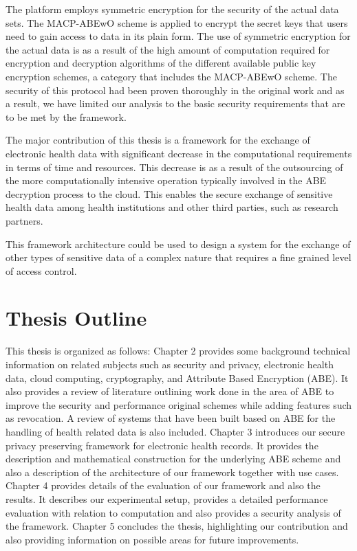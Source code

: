 The platform employs symmetric encryption for the security of the actual data sets. The MACP-ABEwO scheme is applied to encrypt the secret keys that users need to gain access to data in its plain form. The use of symmetric encryption for the actual data is as a result of the high amount of computation required for encryption and decryption algorithms of the different available public key encryption schemes, a category that includes the MACP-ABEwO scheme. The security of this protocol had been proven thoroughly in the original work \cite{Yang2014} and as a result, we have limited our analysis to the basic security requirements that are to be met by the framework.

The major contribution of this thesis is a framework for the exchange of electronic health data with significant decrease in the computational requirements in terms of time and resources. This decrease is as a result of the outsourcing of the more computationally intensive operation typically involved in the ABE decryption process to the cloud. This enables the secure exchange of sensitive health data among health institutions and other third parties, such as research partners.

This framework architecture could be used to design a system for the exchange of other types of sensitive data of a complex nature that requires a fine grained level of access control.


\section{Thesis Outline}

This thesis is organized as follows: Chapter 2 provides some background technical information on related subjects such as security and privacy, electronic health data, cloud computing, cryptography, and Attribute Based Encryption (ABE). It also provides a review of literature outlining work done in the area of ABE to improve the security and performance original schemes while adding features such as revocation. A review of systems that have been built based on ABE for the handling of health related data is also included. Chapter 3 introduces our secure privacy preserving framework for electronic health records. It provides the description and mathematical construction for the underlying ABE scheme and also a description of the architecture of our framework together with use cases. Chapter 4 provides details of the evaluation of our framework and also the results. It describes our experimental setup, provides a detailed performance evaluation with relation to computation and also provides a security analysis of the framework. Chapter 5 concludes the thesis, highlighting our contribution and also providing information on possible areas for future improvements.